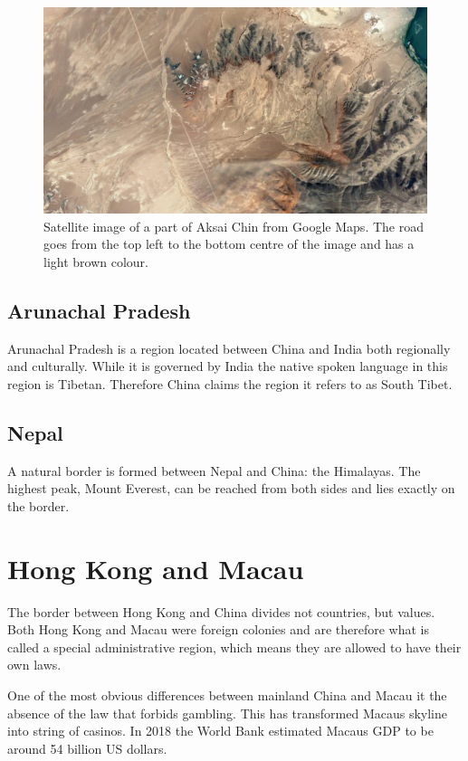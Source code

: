 \documentclass[conference]{IEEEtran}
\begin{document}
	\begin{figure}[t]
	\centering
	\includegraphics[width=\linewidth]{img/india_jammuAndKashmir_road.png}
	\caption{Satellite image of a part of Aksai Chin from Google Maps. The road goes from the top left to the bottom centre of the image and has a light brown colour.}
	\label{pic:india_jammuAndKashmir_road}
	\end{figure}
	
	\subsection{Arunachal Pradesh}
	Arunachal Pradesh is a region located between China and India both regionally and culturally. While it is governed by India the native spoken language in this region is Tibetan. Therefore China claims the region it refers to as South Tibet.
	
	\subsection{Nepal}
	A natural border is formed between Nepal and China: the Himalayas. The highest peak, Mount Everest, can be reached from both sides and lies exactly on the border.
	
	\section{Hong Kong and Macau}
	The border between Hong Kong and China divides not countries, but values. Both Hong Kong and Macau were foreign colonies and are therefore what is called a special administrative region, which means they are allowed to have their own laws.
	
	One of the most obvious differences between mainland China and Macau it the absence of the law that forbids gambling. This has transformed Macaus skyline into string of casinos. In 2018 the World Bank estimated Macaus GDP to be around 54 billion US dollars.
	
\end{document}
